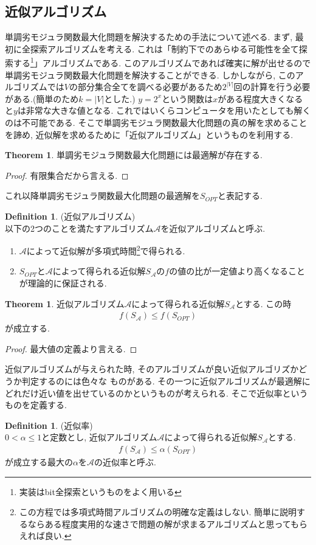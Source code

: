 \documentclass[11pt, a4paper, dvipdfmx]{jsbook}
\theoremstyle{definition}
\newtheorem{Definition+}[Axiom+]{Definition}
\newtheorem{Theorem+}[Axiom+]{Theorem}
\begin{document}
 \subsection{近似アルゴリズム}
単調劣モジュラ関数最大化問題を解決するための手法について述べる. 
まず, 最初に全探索アルゴリズムを考える. これは「制約下でのあらゆる可能性を全て探索する\footnote{実装はbit全探索というものをよく用いる}」アルゴリズムである. 
このアルゴリズムであれば確実に解が出せるので単調劣モジュラ関数最大化問題を解決することができる. 
しかしながら, このアルゴリズムでは$V$の部分集合全てを調べる必要があるため$2^{|V|}$回の計算を行う必要がある.(簡単のため$k = |V|$とした.)
$y = 2^x$という関数は$x$がある程度大きくなると$y$は非常な大きな値となる. 
これではいくらコンピュータを用いたとしても解くのは不可能である. そこで単調劣モジュラ関数最大化問題の真の解を求めることを諦め,
近似解を求めるために「近似アルゴリズム」というものを利用する. 
\begin{Theorem+}
    単調劣モジュラ関数最大化問題には最適解が存在する.
\begin{proof}
    有限集合だから言える.
\end{proof}
これ以降単調劣モジュラ関数最大化問題の最適解を$S_{OPT}$と表記する.
\end{Theorem+}
\begin{Definition+}(近似アルゴリズム)\\
    以下の2つのことを満たすアルゴリズム$\mathcal{A}$を近似アルゴリズムと呼ぶ.
    \begin{enumerate}
        \item $\mathcal{A}$によって近似解が多項式時間\footnote{この方程では多項式時間アルゴリズムの明確な定義はしない. 簡単に説明するならある程度実用的な速さで問題の解が求まるアルゴリズムと思ってもらえれば良い. }で得られる.
        \item $S_{OPT}$と$\mathcal{A}$によって得られる近似解$S_{\mathcal{A}}$の$f$の値の比が一定値より高くなることが理論的に保証される.
    \end{enumerate}
\end{Definition+}
\begin{Theorem+}
    近似アルゴリズム$\mathcal{A}$によって得られる近似解$S_{\mathcal{A}}$とする. この時
    \begin{align*}
        f(S_{\mathcal{A}})\leq f(S_{OPT})
    \end{align*}
    が成立する.
    \begin{proof}
        最大値の定義より言える.
    \end{proof}
\end{Theorem+}
近似アルゴリズムが与えられた時, そのアルゴリズムが良い近似アルゴリズかどうか判定するのには色々な
ものがある. その一つに近似アルゴリズムが最適解にどれだけ近い値を出せているのかというものが考えられる. そこで近似率というものを定義する.
\begin{Definition+}(近似率)\\
    $ 0< \alpha \leq 1$と定数とし, 近似アルゴリズム$\mathcal{A}$によって得られる近似解$S_{\mathcal{A}}$とする. 
    \begin{align*}
        f(S_{\mathcal{A}})\leq \alpha(S_{OPT})
    \end{align*}
    が成立する最大の$\alpha$を$\mathcal{A}$の近似率と呼ぶ.
\end{Definition+}
\end{document}
